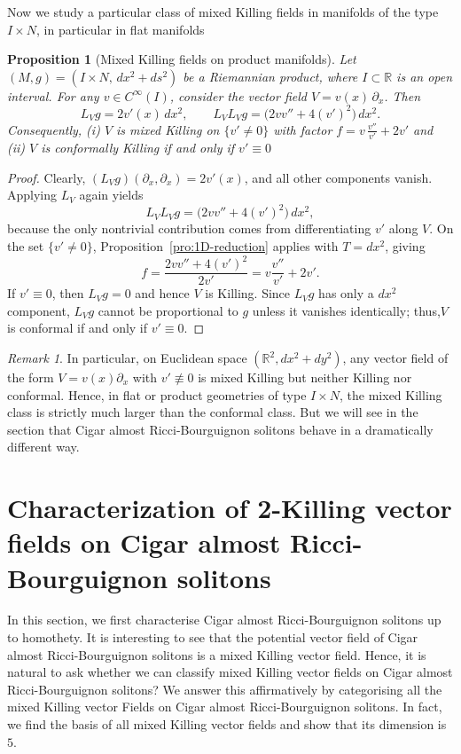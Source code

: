 \documentclass{article}
\newtheorem{proposition}[theorem]{Proposition}
\theoremstyle{definition}
\theoremstyle{remark}
\newtheorem{remark}{Remark}[section]
\begin{document}
Now we study a particular class of mixed Killing fields in manifolds of the type $I\times N$, in particular in flat manifolds  

\begin{proposition}[Mixed Killing fields on product manifolds]
\label{prop:product-mixed-killing}
Let $(M,g) = (I\times N,\,dx^2 + ds^2)$ be a Riemannian product, where
$I\subset\mathbb{R}$ is an open interval.
For any $v\in C^\infty(I)$, consider the vector field $V = v(x)\,\partial_x$.
Then
\[
L_V g = 2v'(x)\,dx^2, \qquad
L_V L_V g = \bigl(2v v'' + 4(v')^2\bigr)\,dx^2.
\]
Consequently,  (i) $V$ is mixed Killing on $\{v'\neq 0\}$ with factor
$f = v\,\frac{v''}{v'} + 2v'$  and (ii)  $V$ is conformally Killing if and only if $v'\equiv 0$
\end{proposition}

\begin{proof}
Clearly, $(L_V g)(\partial_x, \partial_x) = 2v'(x)$,
and all other components vanish. Applying $L_V$ again yields
\[
L_V L_V g = \bigl(2v v'' + 4(v')^2\bigr)\,dx^2,
\]
because the only nontrivial contribution comes from differentiating $v'$ along $V$.
On the set $\{v'\neq 0\}$, Proposition~\ref{pro:1D-reduction} applies with $T = dx^2$, giving
\[
f = \frac{2vv'' + 4(v')^2}{2v'} = v\frac{v''}{v'} + 2v'.
\]
If $v'\equiv 0$, then $L_V g=0$ and hence $V$ is Killing.
Since $L_V g$ has only a $dx^2$ component, $L_V g$ cannot be proportional to $g$ unless it vanishes identically; thus,$V$ is conformal if and only if $v'\equiv 0$.  
\end{proof}

\begin{remark}
In particular, on Euclidean space $(\mathbb{R}^2,dx^2+dy^2)$, any vector
field of the form $V=v(x)\partial_x$ with $v'\not\equiv 0$ is mixed Killing
but neither Killing nor conformal. Hence, in flat or product geometries of type $I \times N$,
the mixed Killing class is strictly much larger than the conformal class. But we will see in the section that Cigar almost Ricci-Bourguignon solitons behave in a dramatically different way. 
\end{remark}

\section{Characterization of 2-Killing vector fields on  Cigar almost Ricci-Bourguignon solitons}\label{sec:Cigar-RB}

In this section, we first characterise Cigar almost Ricci-Bourguignon solitons up to homothety.
It is interesting to see that the potential vector field of  Cigar almost Ricci-Bourguignon solitons  
is a mixed Killing vector field. Hence, it is natural to ask whether we can classify mixed Killing vector fields
on Cigar almost Ricci-Bourguignon solitons? We answer this affirmatively by categorising all the mixed Killing vector Fields on Cigar almost Ricci-Bourguignon solitons.  In fact, we find the 
basis of all mixed Killing vector fields and show that its
dimension is $5$. 
\end{document}
